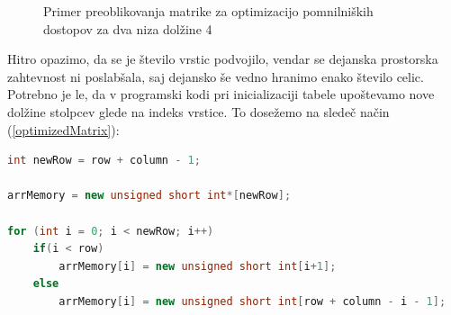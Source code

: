 \documentclass[a4paper,12pt,openright]{book}
\begin{document}
\begin{figure}[htb]
\caption{Primer preoblikovanja matrike za optimizacijo pomnilniških dostopov za dva niza dolžine 4}
\label{matrixTransformation}
\end{figure}

Hitro opazimo, da se je število vrstic podvojilo, vendar se dejanska prostorska zahtevnost ni poslabšala, saj dejansko še vedno hranimo enako število celic. Potrebno je le, da v programski kodi pri inicializaciji tabele upoštevamo nove dolžine stolpcev glede na indeks vrstice. To dosežemo na sledeč način (\ref{optimizedMatrix}): 

\begin{lstlisting}[language=C++, caption={Inicializacija optimizirane tabele}, captionpos=b, label=optimizedMatrix]
int newRow = row + column - 1;

arrMemory = new unsigned short int*[newRow];

for (int i = 0; i < newRow; i++) 
    if(i < row)
        arrMemory[i] = new unsigned short int[i+1];
    else
        arrMemory[i] = new unsigned short int[row + column - i - 1];
\end{lstlisting}
\end{document}
